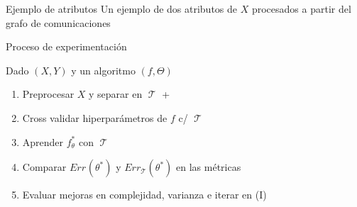 \documentclass[xcolor=x11names]{beamer}
\DeclareMathOperator{\trainset}{\mathcal{T}}
\DeclareMathOperator{\testset}{\mathcal{T_s}}
\begin{document}
%
%


\begin{frame}{Ejemplo de atributos}
Un ejemplo de dos atributos de $X$ procesados a partir del grafo de comunicaciones
	\begin{table}[ht]
		\small
		\centering
	\end{table}
\end{frame}



\begin{frame}{ Proceso de experimentación }

Dado $(X,Y)$ y un algoritmo $\left( f, \Theta \right)  $
	\begin{enumerate}[I]
		\item Preprocesar $X$ y separar en $\trainset$ + $\testset$
		\item Cross validar hiperparámetros de $f$ c/ $\trainset$
		\item Aprender $f_\theta^*$ con $\trainset$
		\item Comparar  $Err_{\testset}(\theta^*)$ y  $Err_{\trainset}(\theta^*)$ en las métricas
		\item Evaluar mejoras en complejidad, varianza e iterar en (I)
	\end{enumerate}

\end{frame}
\end{document}
